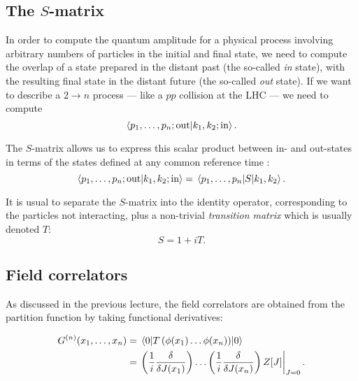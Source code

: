 \documentclass{article}
\numberwithin{equation}{section}
\begin{document}
\subsection{The $S$-matrix}

In order to compute the quantum amplitude for a physical process involving arbitrary numbers of particles in the initial and final state, we need to compute the overlap of a state prepared in the distant past (the so-called \textit{in} state), with the resulting final state in the distant future (the so-called \textit{out} state). If we want to describe a $2 \rightarrow n$ process --- like a $pp$ collision at the LHC --- we need to compute 
\begin{equation}
    \braket{p_1, \dots , p_n; \text{out}}{k_1, k_2; \text{in}}.
\end{equation}

The $S$-matrix allows us to express this scalar product between in- and out-states in terms of the states defined at any common reference time :
\begin{equation}
    \braket{p_1, \dots , p_n; \text{out}}{k_1, k_2; \text{in}} = \mel{p_1, \dots , p_n}{S}{k_1, k_2}.
\end{equation}

It is usual to separate the $S$-matrix into the identity operator, corresponding to the particles not interacting, plus a non-trivial \textit{transition matrix} which is usually denoted $T$:
\begin{equation}
    S = 1 + iT.
\end{equation}




\subsection{Field correlators}\label{sec:field_correlators}
As discussed in the previous lecture, the field correlators are obtained from the partition function by taking functional derivatives:

\begin{equation}
\begin{aligned}
    G^{(n)}(x_1, \dots , x_n) &= \ev{T\left(\phi(x_1) \dots \phi(x_n)\right)}{0} \\
    &= \eval{\left(\frac{1}{i}\fdv{J(x_1)}\right) \dots \left(\frac{1}{i}\fdv{J(x_n)}\right) Z[J]}_{J=0}.
\end{aligned}
\end{equation}
\end{document}
